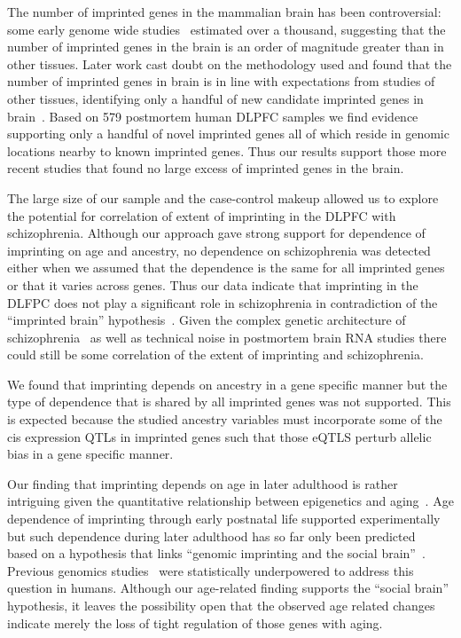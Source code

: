 \documentclass[letterpaper]{article}
\begin{document}
The number of imprinted genes in the mammalian brain has been controversial:
some early genome wide studies~\cite{Gregg2010a,Gregg2010} estimated over a
thousand, suggesting that the number of imprinted genes in the brain is an
order of magnitude greater than in other tissues.  Later work cast doubt on
the methodology used and found that the number of imprinted genes in brain is
in line with expectations from studies of other tissues, identifying only a
handful of new candidate imprinted genes in brain~\cite{Baran2015,DeVeale2012,Perez2015}.
Based on 579 postmortem human DLPFC
samples we find evidence supporting only a handful of novel imprinted genes
all of which reside in genomic locations nearby to known imprinted genes.
Thus our results support those more recent studies that found no large excess
of imprinted genes in the brain.

The large size of our sample and the case-control makeup allowed us to explore
the potential for correlation of extent of imprinting in the DLPFC with
schizophrenia.  Although our approach gave strong support for dependence of
imprinting on age and ancestry, no dependence on schizophrenia was detected
either when we assumed that the dependence is the same for all imprinted genes
or that it varies across genes.  Thus our data indicate that imprinting in the
DLFPC does not play a significant role in schizophrenia in contradiction of
the ``imprinted brain'' hypothesis~\cite{Crespi2008}.  Given the complex
genetic architecture of schizophrenia~\cite{Sullivan2012} as well as technical
noise in postmortem brain RNA studies there could still be some correlation of
the extent of imprinting and schizophrenia.

We found that imprinting depends on ancestry in a gene
specific manner but the type of dependence that is shared by all imprinted
genes was not supported.  This is expected because the studied
ancestry variables must incorporate some of the cis expression
QTLs in imprinted genes such that those eQTLS perturb allelic bias in a gene
specific manner.

Our finding that imprinting depends on age in later adulthood is rather
intriguing given the quantitative relationship between epigenetics and
aging~\cite{Horvath2013}.  Age dependence of imprinting through early
postnatal life supported experimentally~\cite{Perez2015} but such dependence
during later adulthood has so far only been predicted~\cite{Ubeda2012} based
on a hypothesis that links ``genomic imprinting and the social
brain''~\cite{Isles2006}.  Previous genomics studies~\cite{Baran2015} were
statistically underpowered to address this question in humans.  Although our
age-related finding supports the ``social brain'' hypothesis, it leaves the
possibility open that the observed age related changes indicate merely the
loss of tight regulation of those genes with aging.
\end{document}

